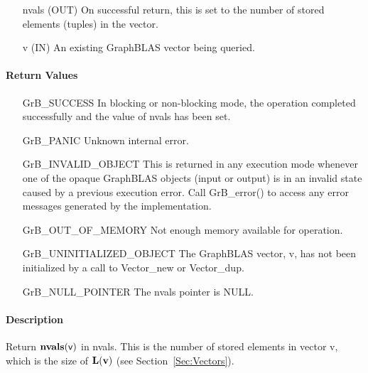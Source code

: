 \begin{itemize}[leftmargin=1.1in]
    \item[{\sf nvals}] ({\sf OUT}) On successful return, this is set to the number of 
                                   stored elements (tuples) in the vector.
    \item[{\sf v}]     ({\sf IN})  An existing GraphBLAS vector being queried.
\end{itemize}


\paragraph{Return Values}

\begin{itemize}[leftmargin=2.1in]
    \item[{\sf GrB\_SUCCESS}]  In blocking or non-blocking mode, the operation 
    completed successfully and the value of {\sf nvals} has been set. 

    \item[{\sf GrB\_PANIC}]    Unknown internal error.
    
    \item[{\sf GrB\_INVALID\_OBJECT}] This is returned in any execution mode 
    whenever one of the opaque GraphBLAS objects (input or output) is in an invalid 
    state caused by a previous execution error.  Call {\sf GrB\_error()} to access 
    any error messages generated by the implementation.

    \item[{\sf GrB\_OUT\_OF\_MEMORY}] Not enough memory available for operation.
    
    \item[{\sf GrB\_UNINITIALIZED\_OBJECT}]  The GraphBLAS vector, {\sf v}, has 
    not been initialized by a call to {\sf Vector\_new} or {\sf Vector\_dup}.
    
    \item[{\sf GrB\_NULL\_POINTER}]  The {\sf nvals} pointer is {\sf NULL}.
\end{itemize}

\paragraph{Description}


Return $\mathbf{nvals}({\sf v})$ in {\sf nvals}. This is the number of stored 
elements in vector {\sf v}, which is the size of $\mathbf{L}({\bf v})$ (see 
Section~\ref{Sec:Vectors}).

